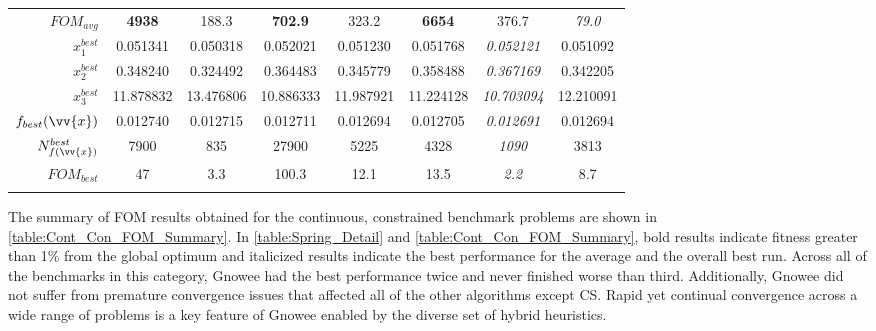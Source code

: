 \documentclass{article}                                                                           %
\begin{document}
\begin{landscape}
\begin{table}[!]
{\begin{tabular}{r c c c c c c c }
     $FOM_{avg}$ & \textbf{4938} & 188.3 & \textbf{702.9} & 323.2 & \textbf{6654} & 376.7 & \textit{79.0} \\ \addlinespace
    \midrule
     $x_1^{best}$ & 0.051341 & 0.050318 & 0.052021 & 0.051230 & 0.051768 & \textit{0.052121} & 0.051092 \\ \addlinespace
     $x_2^{best}$ & 0.348240 & 0.324492 & 0.364483 & 0.345779 & 0.358488 & \textit{0.367169} & 0.342205 \\ \addlinespace
     $x_3^{best}$ & 11.878832 & 13.476806 & 10.886333 & 11.987921 & 11.224128 & \textit{10.703094} & 12.210091 \\ \addlinespace
     $f_{best}(\vv{x})$ & 0.012740 & 0.012715 & 0.012711 & 0.012694 & 0.012705 & \textit{0.012691} & 0.012694 \\    \addlinespace
     $N_{f(\vv{x})}^{best}$ & 7900 & 835 & 27900 & 5225 & 4328 & \textit{1090} & 3813 \\ \addlinespace
     $FOM_{best}$ & 47 & 3.3 & 100.3 & 12.1 & 13.5 & \textit{2.2} & 8.7 \\ \addlinespace
     \bottomrule
     \end{tabular}}
\end{table}
\end{landscape}
\pagestyle{plain}

The summary of FOM results obtained for the continuous, constrained benchmark problems are shown in \autoref{table:Cont_Con_FOM_Summary}.
In \autoref{table:Spring_Detail} and \autoref{table:Cont_Con_FOM_Summary}, bold results indicate fitness greater than 1\% from the global optimum and italicized results indicate the best performance for the average and the overall best run.
Across all of the benchmarks in this category, Gnowee had the best performance twice and never finished worse than third.
Additionally, Gnowee did not suffer from premature convergence issues that affected all of the other algorithms except CS.
Rapid yet continual convergence across a wide range of problems is a key feature of Gnowee enabled by the diverse set of hybrid heuristics.
\end{document}
